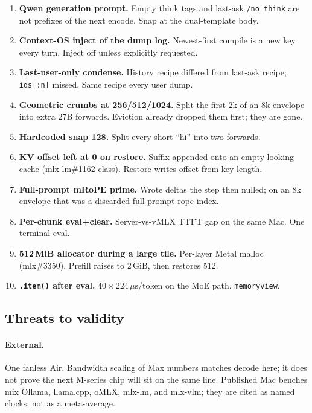 \begin{enumerate}[leftmargin=1.4em]
\item \textbf{Qwen generation prompt.} Empty think tags and last-ask \texttt{/no\_think} are not prefixes of the next encode. Snap at the dual-template body.
\item \textbf{Context-OS inject of the dump log.} Newest-first compile is a new key every turn. Inject off unless explicitly requested.
\item \textbf{Last-user-only condense.} History recipe differed from last-ask recipe; \texttt{ids[:n]} missed. Same recipe every user dump.
\item \textbf{Geometric crumbs at 256/512/1024.} Split the first 2k of an 8k envelope into extra 27B forwards. Eviction already dropped them first; they are gone.
\item \textbf{Hardcoded snap 128.} Split every short ``hi'' into two forwards.
\item \textbf{KV offset left at 0 on restore.} Suffix appended onto an empty-looking cache (mlx-lm\#1162 class). Restore writes offset from key length.
\item \textbf{Full-prompt mRoPE prime.} Wrote deltas the step then nulled; on an 8k envelope that was a discarded full-prompt rope index.
\item \textbf{Per-chunk eval+clear.} Server-vs-vMLX TTFT gap on the same Mac. One terminal eval.
\item \textbf{512\,MiB allocator during a large tile.} Per-layer Metal malloc (mlx\#3350). Prefill raises to 2\,GiB, then restores 512.
\item \textbf{\texttt{.item()} after eval.} $40\times 224\,\mu\mathrm{s}$/token on the MoE path. \texttt{memoryview}.
\end{enumerate}

\subsection{Threats to validity}

\paragraph{External.} One fanless Air. Bandwidth scaling of Max numbers matches decode here; it does not prove the next M-series chip will sit on the same line. Published Mac benches mix Ollama, llama.cpp, oMLX, mlx-lm, and mlx-vlm; they are cited as named clocks, not as a meta-average.

